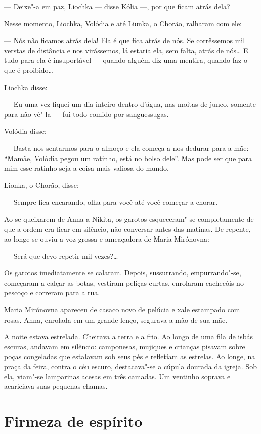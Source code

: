 --- Deixe"-a em paz, Liochka --- disse Kólia ---, por que ficam atrás dela?

Nesse momento, Liochka, Volódia e até Liоnka, o Chorão, ralharam com
ele:

--- Nós não ficamos atrás dela! Ela é que fica atrás de nós. Se
corrêssemos mil verstas de distância e nos virássemos, lá estaria ela,
sem falta, atrás de nós\ldots{} E tudo para ela é insuportável --- quando
alguém diz uma mentira, quando faz o que é proibido\ldots{}

Liochka disse:

--- Eu uma vez fiquei um dia inteiro dentro d'água, nas moitas de junco,
somente para não vê"-la --- fui todo comido por sanguessugas.

Volódia disse:

--- Basta nos sentarmos para o almoço e ela começa a nos dedurar para a
mãe: ``Mamãe, Volódia pegou um ratinho, está no bolso dele''. Mas pode
ser que para mim esse ratinho seja a coisa mais valiosa do mundo.

Lionka, o Chorão, disse:

--- Sempre fica encarando, olha para você até você começar a chorar.

Ao se queixarem de Anna a Nikita, os garotos esqueceram"-se completamente
de que a ordem era ficar em silêncio, não conversar antes das matinas.
De repente, ao longe se ouviu a voz grossa e ameaçadora de Maria
Mirónovna:

--- Será que devo repetir mil vezes?\ldots{}

Os garotos imediatamente se calaram. Depois, sussurrando, empurrando"-se,
começaram a calçar as botas, vestiram peliças curtas, enrolaram
cachecóis no pescoço e correram para a rua.

Maria Mirónovna apareceu de casaco novo de pelúcia e xale estampado com
rosas. Anna, enrolada em um grande lenço, segurava a mão de sua mãe.

A noite estava estrelada. Cheirava a terra e a frio. Ao longo de uma
fila de isbás escuras, andavam em silêncio: camponesas, mujiques e
crianças pisavam sobre poças congeladas que estalavam sob seus pés e
refletiam as estrelas. Ao longe, na praça da feira, contra o céu escuro,
destacava"-se a cúpula dourada da igreja. Sob ela, viam"-se lamparinas
acesas em três camadas. Um ventinho soprava e acariciava suas pequenas
chamas.

\chapter{Firmeza de espírito}

